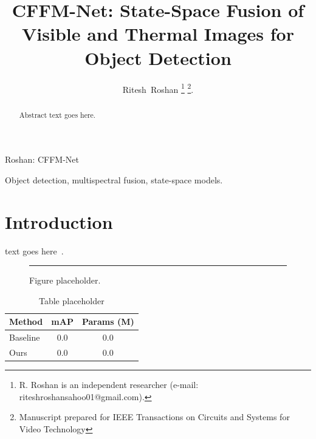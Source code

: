\documentclass[journal]{IEEEtran}
\begin{document}
\title{CFFM-Net: State-Space Fusion of Visible and Thermal Images for Object Detection}

\author{Ritesh~Roshan%
\thanks{R. Roshan is an independent researcher (e-mail: riteshroshansahoo01@gmail.com).}%
\thanks{Manuscript prepared for IEEE Transactions on Circuits and Systems for Video Technology}.}

%
{Roshan: CFFM-Net}

\maketitle

\begin{abstract}
Abstract text goes here.
\end{abstract}

\begin{IEEEkeywords}
Object detection, multispectral fusion, state-space models.
\end{IEEEkeywords}

\section{Introduction}
\label{sec:intro}
 text goes here~\cite{gu2023mamba}.

\begin{figure}[t]
  \centering
  \rule{0.9\linewidth}{4cm}
  \caption{Figure placeholder.}
  \label{fig:placeholder}
\end{figure}

\begin{table}[t]
  \caption{Table placeholder}
  \label{tab:placeholder}
  \centering
  \begin{tabular}{lcc}
    \toprule
    Method & mAP & Params (M) \\
    \midrule
    Baseline & 0.0 & 0.0 \\
    Ours & 0.0 & 0.0 \\
    \bottomrule
  \end{tabular}
\end{table}



\end{document}
